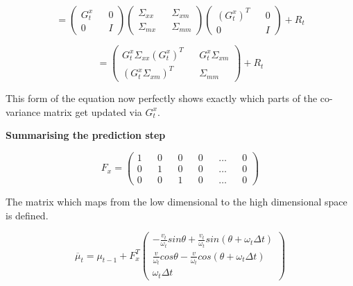 \documentclass[a4paper]{article}
\begin{document}
\begin{equation*}
    = 
    \begin{pmatrix}
            G_t^x && 0 \\ 0 && I
    \end{pmatrix}
    \begin{pmatrix}
            \Sigma_{xx} && \Sigma_{xm}
            \\
            \Sigma_{mx} && \Sigma_{mm}
    \end{pmatrix}
    \begin{pmatrix}
        (G_t^x)^T && 0 \\ 0 && I    
    \end{pmatrix}
     + R_t
\end{equation*}

\begin{equation*}
    = 
    \begin{pmatrix}
        G_t^x \Sigma_{xx} (G_t^x)^T && G_t^x \Sigma_{xm}
        \\
        (G_t^x \Sigma_{xm})^T && \Sigma_{mm}    
    \end{pmatrix}
     + R_t
\end{equation*}

This form of the equation now perfectly shows exactly which parts of the co-variance matrix get updated via $G_t^x$.

\textbf{Summarising the prediction step}

\begin{equation*}
    F_x = 
    \begin{pmatrix}
        1 && 0 && 0 && 0 && \hdots && 0
        \\
        0 && 1 && 0 && 0 && \hdots && 0
        \\
        0 && 0 && 1 && 0 && \hdots && 0
    \end{pmatrix}
\end{equation*}

The matrix which maps from the low dimensional to the high dimensional space is defined.

\begin{equation*}
    \overline{\mu}_t = \mu_{t-1} + F_x^T 
    \begin{pmatrix}
    - \frac{v_t}{\omega_t} sin\theta + \frac{v_t}{\omega_t} sin (\theta + \omega_t \Delta t)
    \\ \frac{v}{\omega_t} cos\theta - \frac{v}{\omega_t} cos (\theta + \omega_t \Delta t) 
    \\ \omega_t \Delta t
    \end{pmatrix}
\end{equation*}
\end{document}
